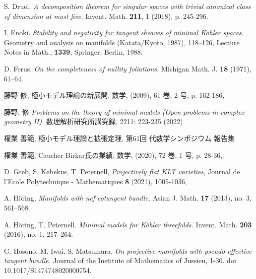 \documentclass[12pt]{amsart}
\theoremstyle{definition}
\theoremstyle{remark}
\begin{document}
\begin{thebibliography}{n}
 
 
S. Druel. \textit{A decomposition theorem for singular spaces with trivial canonical class of dimension at most five.}
Invent. Math. {\bf{211}}, 1 (2018), p. 245-296.

I. Enoki. 
\textit{Stability and negativity for tangent sheaves of minimal K\"ahler spaces.} 
Geometry and analysis on manifolds (Katata/Kyoto, 1987), 118--126, 
Lecture Notes in Math., {\bf{1339}}, Springer, Berlin,  1988.
 
D. Ferus, 
\textit{On the completeness of nullity foliations.}
 Michigan Math. J.  {\bf{18}}  (1971), 61--64.
 

藤野 修, 極小モデル理論の新展開, 数学, (2009), 61 巻, 2 号, p. 162-186, 

 藤野, 修 
 \textit{Problems on the theory of minimal models (Open problems in complex geometry II).}
 数理解析研究所講究録, 2211: 223-235 (2022)
 

 權業 善範, 極小モデル理論と拡張定理, 第61回 代数学シンポジウム 報告集

 權業 善範, Caucher Birkar氏の業績, 数学, (2020), 72 巻, 1 号, p. 28-36, 
 
 
D. Greb, S. Kebekus, T. Peternell, 
\textit{Projectively flat KLT varieties},
Journal de l'Ecole Polytechnique - Mathematiques {\bf 8} (2021), 1005-1036,


A. H\"oring, 
\textit{Manifolds with nef cotangent bundle.}
 Asian J. Math.  {\bf 17}  (2013),  no. 3, 561--568.

A. H\"oring, T. Peternell.
\textit{Minimal models for K\"ahler threefolds.}
 Invent. Math.  {\bf{203}}  (2016),  no. 1, 217--264.
 
G. Hosono, M. Iwai, S. Matsumura.
\textit{On projective manifolds with pseudo-effective tangent bundle.}
Journal of the Institute of Mathematics of Jussieu, 1-30. 
doi 10.1017/S1474748020000754.


\end{thebibliography}
\end{document}

